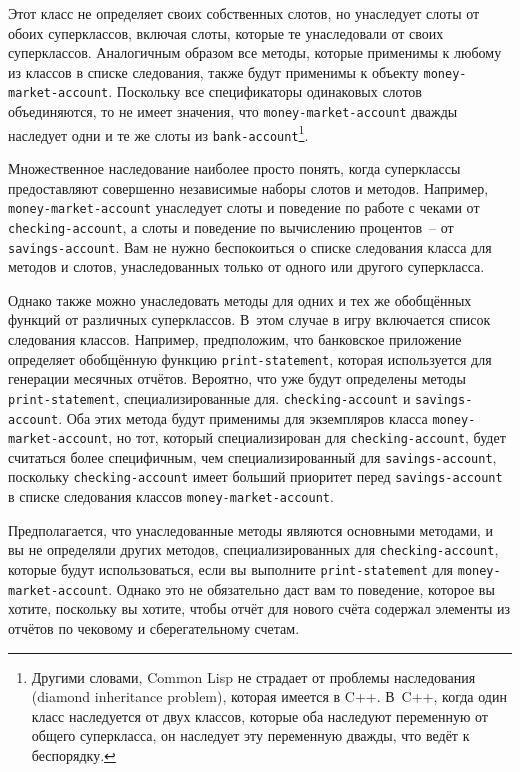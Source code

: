 Этот класс не определяет своих собственных слотов, но унаследует слоты от обоих
суперклассов, включая слоты, которые те унаследовали от своих суперклассов.  Аналогичным
образом все методы, которые применимы к любому из классов в списке следования, также
будут применимы к объекту \lstinline{money-market-account}.  Поскольку все спецификаторы
одинаковых слотов объединяются, то не имеет значения, что \lstinline{money-market-account}
дважды наследует одни и те же слоты из \lstinline{bank-account}\footnote{Другими словами,
  Common Lisp не страдает от проблемы наследования (diamond inheritance problem), которая
  имеется в C++.  В~C++, когда один класс наследуется от двух классов, которые оба
  наследуют переменную от общего суперкласса, он наследует эту переменную дважды, что
  ведёт к беспорядку.}.

Множественное наследование наиболее просто понять, когда суперклассы предоставляют
совершенно независимые наборы слотов и методов.  Например, \lstinline{money-market-account}
унаследует слоты и поведение по работе с чеками от \lstinline{checking-account}, а слоты и
поведение по вычислению процентов~-- от \lstinline{savings-account}.  Вам не нужно беспокоиться
о списке следования класса для методов и слотов, унаследованных только от одного или
другого суперкласса.

Однако также можно унаследовать методы для одних и тех же обобщённых функций от
различных суперклассов.  В~этом случае в игру включается список следования
классов.  Например, предположим, что банковское приложение определяет обобщённую функцию
\lstinline{print-statement}, которая используется для генерации месячных отчётов.  Вероятно,
что уже будут определены методы \lstinline{print-statement}, специализированные для.
\lstinline{checking-account} и \lstinline{savings-account}.  Оба этих метода будут применимы для
экземпляров класса \lstinline{money-market-account}, но тот, который специализирован для
\lstinline{checking-account}, будет считаться более специфичным, чем специализированный для
\lstinline{savings-account}, поскольку \lstinline{checking-account} имеет больший приоритет перед
\lstinline{savings-account} в списке следования классов \lstinline{money-market-account}.

Предполагается, что унаследованные методы являются основными методами, и вы не определяли
других методов, специализированных для \lstinline{checking-account}, которые будут
использоваться, если вы выполните \lstinline{print-statement} для \lstinline{money-market-account}.
Однако это не обязательно даст вам то поведение, которое вы хотите, поскольку вы хотите,
чтобы отчёт для нового счёта содержал элементы из отчётов по чековому и сберегательному
счетам.

